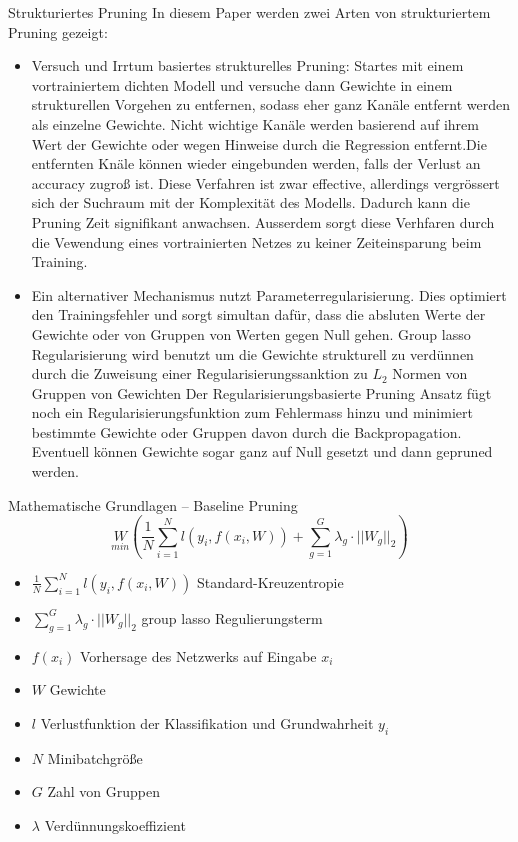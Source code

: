 \documentclass[10pt]{beamer}
\begin{document}
\begin{frame}[allowframebreaks]{Strukturiertes Pruning}
In diesem Paper werden zwei Arten von strukturiertem Pruning gezeigt:
\begin{itemize}
 \item Versuch und Irrtum basiertes strukturelles Pruning: Startes mit einem vortrainiertem dichten Modell und versuche dann Gewichte in einem strukturellen Vorgehen zu entfernen, sodass eher ganz Kanäle entfernt werden als einzelne Gewichte. Nicht wichtige Kanäle werden basierend auf ihrem Wert der Gewichte oder wegen Hinweise durch die Regression entfernt.Die entfernten Knäle können wieder eingebunden werden, falls der Verlust an accuracy zugroß ist. Diese Verfahren ist zwar effective, allerdings vergrössert sich der Suchraum mit der Komplexität des Modells. Dadurch kann die Pruning Zeit signifikant anwachsen. Ausserdem sorgt diese Verhfaren durch die Vewendung eines vortrainierten Netzes zu keiner Zeiteinsparung beim Training.
    \item Ein alternativer Mechanismus nutzt Parameterregularisierung. Dies optimiert den Trainingsfehler und sorgt simultan dafür, dass die absluten Werte der Gewichte oder von Gruppen von Werten gegen Null gehen.  Group lasso Regularisierung wird benutzt um die Gewichte strukturell zu verdünnen durch die Zuweisung einer Regularisierungssanktion zu $L_2$ Normen von Gruppen von Gewichten Der Regularisierungsbasierte Pruning Ansatz fügt noch ein Regularisierungsfunktion zum Fehlermass hinzu und minimiert bestimmte Gewichte oder Gruppen davon durch die Backpropagation. Eventuell können Gewichte sogar ganz auf Null gesetzt und dann gepruned werden.

 \end{itemize}
\end{frame}

\begin{frame}{Mathematische Grundlagen -- Baseline Pruning}
 $$ \underset{min}{W} \left( \frac{1}{N} \sum_{i=1}^{N} l(y_i,f(x_i, W)) + \sum_{g=1}^{G} \lambda_g \cdot || W_g ||_2 \right) $$
 \begin{itemize}
  \item $ \frac{1}{N} \sum_{i=1}^{N} l(y_i,f(x_i, W))$ Standard-Kreuzentropie
  \item $\sum_{g=1}^{G} \lambda_g \cdot || W_g ||_2 $ group lasso Regulierungsterm
  \item $f(x_i)$ Vorhersage des Netzwerks auf Eingabe $x_i$
  \item $W$ Gewichte
  \item $l$ Verlustfunktion der Klassifikation und Grundwahrheit $y_i$
  \item $N$ Minibatchgröße
  \item $G$ Zahl von Gruppen
  \item $\lambda$ Verdünnungskoeffizient
 \end{itemize}

\end{frame}
\end{document}

